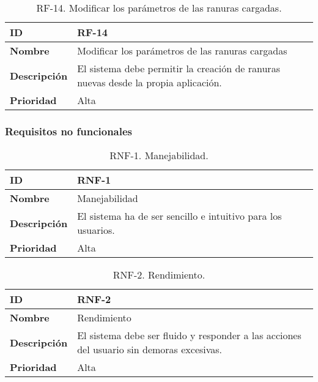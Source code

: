 \begin{table}[h!]
    \centering
    \caption{RF-14. Modificar los parámetros de las ranuras cargadas.}
    \begin{tabular}{|m{2.5cm}|m{9.27cm}|}
        \hline
        \textbf{ID} & RF-14 \\
        \hline
        \textbf{Nombre} & Modificar los parámetros de las ranuras cargadas \\
        \hline
        \textbf{Descripción} & El sistema debe permitir la creación de ranuras nuevas desde la propia aplicación. \\
        \hline
        \textbf{Prioridad} & Alta \\
        \hline
    \end{tabular}
\end{table}

\FloatBarrier

\subsubsection{Requisitos no funcionales}

\begin{table}[h!]
    \centering
    \caption{RNF-1. Manejabilidad.}
    \begin{tabular}{|m{2.5cm}|m{9.27cm}|}
        \hline
        \textbf{ID} & RNF-1 \\
        \hline
        \textbf{Nombre} & Manejabilidad \\
        \hline
        \textbf{Descripción} & El sistema ha de ser sencillo e intuitivo para los usuarios. \\
        \hline
        \textbf{Prioridad} & Alta \\
        \hline
    \end{tabular}
\end{table}

\begin{table}[h!]
    \centering
    \caption{RNF-2. Rendimiento.}
    \begin{tabular}{|m{2.5cm}|m{9.27cm}|}
        \hline
        \textbf{ID} & RNF-2 \\
        \hline
        \textbf{Nombre} & Rendimiento \\
        \hline
        \textbf{Descripción} & El sistema debe ser fluido y responder a las acciones del usuario sin demoras excesivas. \\
        \hline
        \textbf{Prioridad} & Alta \\
        \hline
    \end{tabular}
\end{table}

